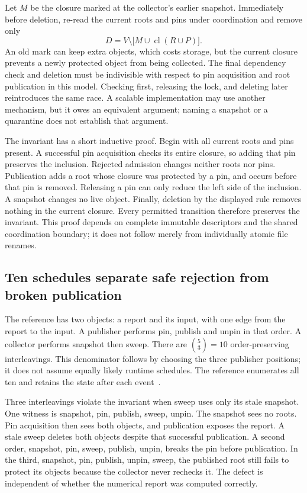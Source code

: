 Let $M$ be the closure marked at the collector's earlier snapshot. Immediately before deletion, re-read the current roots and pins under coordination and remove only
\begin{equation}
 D=V\setminus\bigl[M\cup\operatorname{cl}(R\cup P)\bigr].
 \label{exec17:i4-delete-set}
\end{equation}
An old mark can keep extra objects, which costs storage, but the current closure prevents a newly protected object from being collected. The final dependency check and deletion must be indivisible with respect to pin acquisition and root publication in this model. Checking first, releasing the lock, and deleting later reintroduces the same race. A scalable implementation may use another mechanism, but it owes an equivalent argument; naming a snapshot or a quarantine does not establish that argument.

The invariant has a short inductive proof. Begin with all current roots and pins present. A successful pin acquisition checks its entire closure, so adding that pin preserves the inclusion. Rejected admission changes neither roots nor pins. Publication adds a root whose closure was protected by a pin, and occurs before that pin is removed. Releasing a pin can only reduce the left side of the inclusion. A snapshot changes no live object. Finally, deletion by the displayed rule removes nothing in the current closure. Every permitted transition therefore preserves the invariant. This proof depends on complete immutable descriptors and the shared coordination boundary; it does not follow merely from individually atomic file renames.

\subsection{Ten schedules separate safe rejection from broken publication}
The reference has two objects: a report and its input, with one edge from the report to the input. A publisher performs pin, publish and unpin in that order. A collector performs snapshot then sweep. There are $\binom{5}{3}=10$ order-preserving interleavings. This denominator follows by choosing the three publisher positions; it does not assume equally likely runtime schedules. The reference enumerates all ten and retains the state after each event~\citep{exec17_retention_reference}.

Three interleavings violate the invariant when sweep uses only its stale snapshot. One witness is snapshot, pin, publish, sweep, unpin. The snapshot sees no roots. Pin acquisition then sees both objects, and publication exposes the report. A stale sweep deletes both objects despite that successful publication. A second order, snapshot, pin, sweep, publish, unpin, breaks the pin before publication. In the third, snapshot, pin, publish, unpin, sweep, the published root still fails to protect its objects because the collector never rechecks it. The defect is independent of whether the numerical report was computed correctly.

